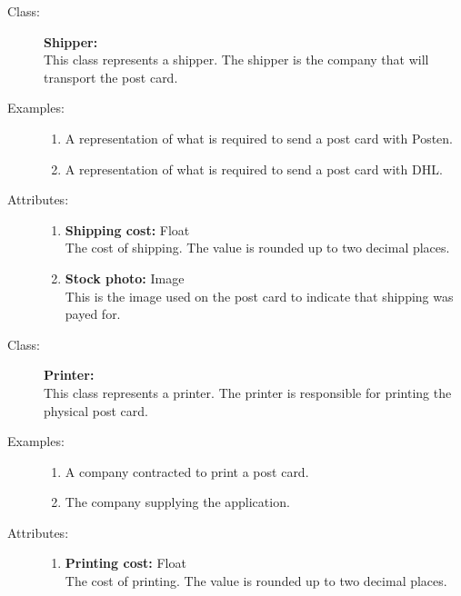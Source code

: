 \documentclass[10pt,a4paper]{article}
\begin{document}
\hrulefill

\begin{description}
\item[Class:] \textbf{Shipper:} \hfill \\
This class represents a shipper. The shipper is the company that will transport the post card. 

\item[Examples:] \hfill
\begin{enumerate}
\item A representation of what is required to send a post card with Posten.
\item A representation of what is required to send a post card with DHL.
\end{enumerate}

\item[Attributes:] \hfill
\begin{enumerate}
\item \textbf{Shipping cost:} Float \hfill \\The cost of shipping. The value is rounded up to two decimal places.
\item \textbf{Stock photo:} Image \hfill \\This is the image used on the post card to indicate that shipping was payed for.
\end{enumerate}
\end{description}

\hrulefill

\begin{description}
\item[Class:] \textbf{Printer:} \hfill \\
This class represents a printer. The printer is responsible for printing the physical post card. 

\item[Examples:] \hfill
\begin{enumerate}
\item A company contracted to print a post card.
\item The company supplying the application.
\end{enumerate}

\item[Attributes:] \hfill
\begin{enumerate}
\item \textbf{Printing cost:} Float \hfill \\The cost of printing. The value is rounded up to two decimal places.
\end{enumerate}
\end{description}
\end{document}
